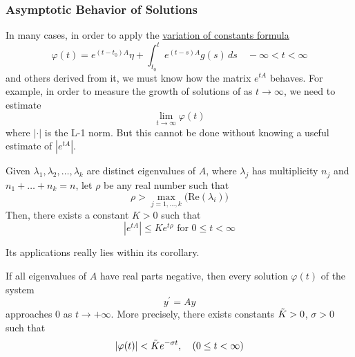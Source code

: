 \documentclass{article}
\newcounter{theorem}[section]
\newcounter{example}[section]
\begin{document}
    \subsubsection{Asymptotic Behavior of Solutions}

      In many cases, in order to apply the \hyperref[thm:variation-of-constants-formula]{variation of constants formula} 
      \begin{equation}
        \varphi(t) = e^{(t - t_0)A} \eta + \int_{t_0}^t e^{(t-s)A} g(s) \,ds \quad -\infty < t< \infty
      \end{equation}
      and others derived from it, we must know how the matrix $e^{tA}$ behaves. For example, in order to measure the growth of solutions of as $t \rightarrow \infty$, we need to estimate 
      \begin{equation}
        \lim_{t\rightarrow \infty} \varphi(t)
      \end{equation}
      where $|\cdot|$ is the L-1 norm. But this cannot be done without knowing a useful estimate of $|e^{tA}|$. 

      \begin{theorem}
        \label{thm:solution-form-from-the-eigenvalues-of-a}
      Given $\lambda_1, \lambda_2, \ldots, \lambda_k$ are distinct eigenvalues of $A$, where $\lambda_j$ has multiplicity $n_j$ and $n_1 + \ldots + n_k = n$, let $\rho$ be any real number such that 
      \begin{equation}
        \rho > \max_{j=1, \ldots, k} \big( \text{Re}(\lambda_i)\big)
      \end{equation}
      Then, there exists a constant $K > 0$ such that
      \begin{equation}
        |e^{tA}| \leq K e^{t \rho} \text{ for } 0 \leq t < \infty
      \end{equation}
      \end{theorem}

      Its applications really lies within its corollary. 

      \begin{corollary}
        \label{thm:asymptotic-stability-from-negative-real-parts}
      If all eigenvalues of $A$ have real parts negative, then every solution $\varphi(t)$ of the system
      \begin{equation}
        y^\prime = A y
      \end{equation}
      approaches $0$ as $t \rightarrow + \infty$. More precisely, there exists constants $\Tilde{K} > 0$, $\sigma > 0$ such that
      \begin{equation}
        |\varphi(t)|< \Tilde{K} e^{-\sigma t}, \quad (0 \leq t < \infty)
      \end{equation}
      \end{corollary}
\end{document}
